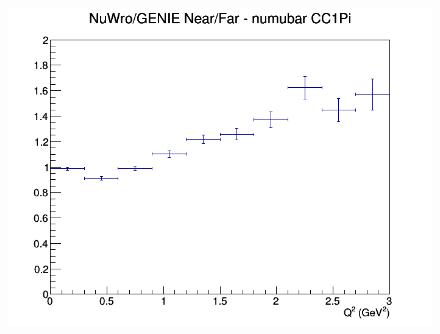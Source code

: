 \begin{figure}[h]
\endminipage
{}
\includegraphics[width=\linewidth]{eff_Q2/FGT/ratios/CC1Pi_NuWro_GENIE_numubar_NF_Q2.png}
\endminipage
\newline
\end{figure}
\clearpage
